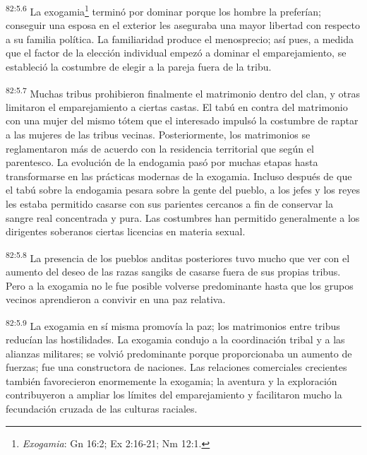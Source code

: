 \documentclass[twoside, 11pt]{book}
\begin{document}
\par
\textsuperscript{82:5.6} La exogamia\footnote{\textit{Exogamia}: Gn 16:2; Ex 2:16-21; Nm 12:1.} terminó por dominar porque los hombre la preferían; conseguir una esposa en el exterior les aseguraba una mayor libertad con respecto a su familia política. La familiaridad produce el menosprecio; así pues, a medida que el factor de la elección individual empezó a dominar el emparejamiento, se estableció la costumbre de elegir a la pareja fuera de la tribu.

\par
\textsuperscript{82:5.7} Muchas tribus prohibieron finalmente el matrimonio dentro del clan, y otras limitaron el emparejamiento a ciertas castas. El tabú en contra del matrimonio con una mujer del mismo tótem que el interesado impulsó la costumbre de raptar a las mujeres de las tribus vecinas. Posteriormente, los matrimonios se reglamentaron más de acuerdo con la residencia territorial que según el parentesco. La evolución de la endogamia pasó por muchas etapas hasta transformarse en las prácticas modernas de la exogamia. Incluso después de que el tabú sobre la endogamia pesara sobre la gente del pueblo, a los jefes y los reyes les estaba permitido casarse con sus parientes cercanos a fin de conservar la sangre real concentrada y pura. Las costumbres han permitido generalmente a los dirigentes soberanos ciertas licencias en materia sexual.

\par
\textsuperscript{82:5.8} La presencia de los pueblos anditas posteriores tuvo mucho que ver con el aumento del deseo de las razas sangiks de casarse fuera de sus propias tribus. Pero a la exogamia no le fue posible volverse predominante hasta que los grupos vecinos aprendieron a convivir en una paz relativa.

\par
\textsuperscript{82:5.9} La exogamia en sí misma promovía la paz; los matrimonios entre tribus reducían las hostilidades. La exogamia condujo a la coordinación tribal y a las alianzas militares; se volvió predominante porque proporcionaba un aumento de fuerzas; fue una constructora de naciones. Las relaciones comerciales crecientes también favorecieron enormemente la exogamia; la aventura y la exploración contribuyeron a ampliar los límites del emparejamiento y facilitaron mucho la fecundación cruzada de las culturas raciales.
\end{document}
